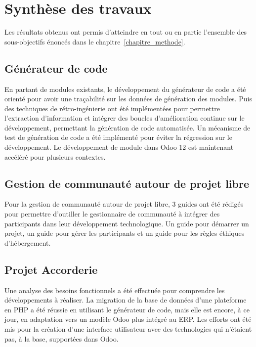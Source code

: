 \label{sec:Conclusion}

\section{Synthèse des travaux}
Les résultats obtenus ont permis d’atteindre en tout ou en partie l’ensemble des sous-objectifs énoncés dans le chapitre~\ref{chapitre_methode}.%


\subsection{Générateur de code}

En partant de modules existants, le développement du générateur de code a été orienté pour avoir une traçabilité sur les données de génération des modules. Puis des techniques de rétro-ingénierie ont été implémentées pour permettre l'extraction d'information et intégrer des boucles d'amélioration continue sur le développement, permettant la génération de code automatisée. Un mécanisme de test de génération de code a été implémenté pour éviter la régression sur le développement. Le développement de module dans Odoo 12 est maintenant accéléré pour plusieurs contextes.

\subsection{Gestion de communauté autour de projet libre}
Pour la gestion de communauté autour de projet libre, 3 guides ont été rédigés pour permettre d'outiller le gestionnaire de communauté à intégrer des participants dans leur développement technologique. Un guide pour démarrer un projet, un guide pour gérer les participants et un guide pour les règles éthiques d'hébergement.

\subsection{Projet Accorderie}

Une analyse des besoins fonctionnels a été effectuée pour comprendre les développements à réaliser. La migration de la base de données d'une plateforme en PHP a été réussie en utilisant le générateur de code, mais elle est encore, à ce jour, en adaptation vers un modèle Odoo plus intégré au ERP. Les efforts ont été mis pour la création d’une interface utilisateur avec des technologies qui n’étaient pas, à la base, supportées dans Odoo.


